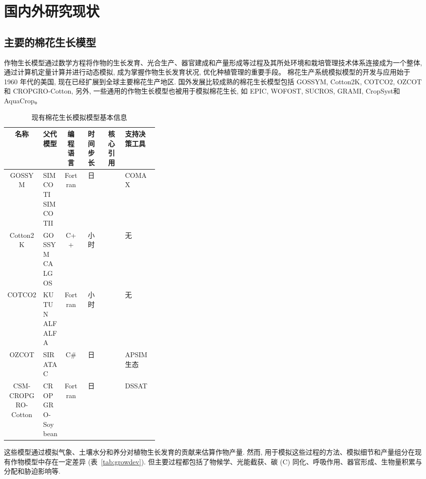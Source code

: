 \documentclass[a4paper,zihao=5]{ctexbook}
\begin{document}
\section{国内外研究现状}
\subsection{主要的棉花生长模型}
作物生长模型通过数学方程将作物的生长发育、光合生产、器官建成和产量形成等过程及其所处环境和栽培管理技术体系连接成为一个整体,
通过计算机定量计算并进行动态模拟, 成为掌握作物生长发育状况, 优化种植管理的重要手段。
棉花生产系统模拟模型的开发与应用始于 1960 年代的美国, 现在已经扩展到全球主要棉花生产地区.
国外发展比较成熟的棉花生长模型包括 GOSSYM\cite{baker1976}, Cotton2K\cite{cotton2kv4}, COTCO2\cite{wall1994}, OZCOT\cite{hearn1994} 和 CROPGRO-Cotton\cite{jones2003},
另外, 一些通用的作物生长模型也被用于模拟棉花生长, 如 EPIC\cite{williams1989}, WOFOST\cite{vanDiepen1989WOFOST}, SUCROS\cite{vanittersum2003}, GRAMI\cite{ko2005}, CropSyst\cite{sommer2008}和 AquaCrop\cite{steduto2009}。

\begin{table}
    \caption{现有棉花生长模拟模型基本信息}
    \small
    \centering
    \begin{tabular}{cp{0.14\linewidth}cccp{0.22\linewidth}}
        \toprule
        名称               & 父代模型         & 编程语言 & 时间步长 & 核心引用          & 支持决策工具 \\
        \midrule
        GOSSYM             & SIMCOTI SIMCOTII & Fortran  & 日       &                   & COMAX        \\
        Cotton2K           & GOSSYM CALGOS    & C++      & 小时     &                   & 无           \\
        COTCO2             & KUTUN ALFALFA    & Fortran  & 小时     &                   & 无           \\
        OZCOT              & SIRATAC          & C\#      & 日       & \citet{hearn1994} & APSIM 生态   \\
        CSM-CROPGRO-Cotton & CROPGRO-Soybean  & Fortran  & 日       &                   & DSSAT        \\
        \bottomrule
    \end{tabular}
\end{table}

这些模型通过模拟气象、土壤水分和养分对植物生长发育的贡献来估算作物产量.
然而, 用于模拟这些过程的方法、模拟细节和产量组分在现有作物模型中存在一定差异 (表~\ref{tab:growdev})\cite{thorp2014}.
但主要过程都包括了物候学、光能截获、碳 (C) 同化、呼吸作用、器官形成、生物量积累与分配和胁迫影响等.
\end{document}
